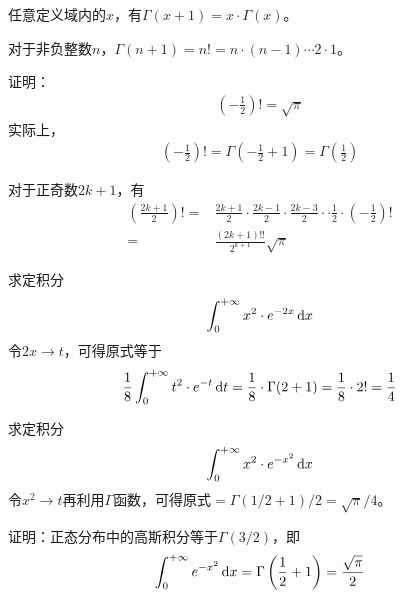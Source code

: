 \begin{question}
  任意定义域内的$x$，有$\Gamma(x + 1) = x\cdot \Gamma(x)$。
\end{question}

\begin{question}
  对于非负整数$n$，$\Gamma(n + 1) = n! = n\cdot (n-1) \cdots 2\cdot 1$。
\end{question}

\begin{question}
  证明：
  \begin{align}
    \left(-\frac12\right)! = \sqrt\pi
  \end{align}
  实际上，
  \begin{align*}
    \left(-\frac12\right)! = \Gamma\left(-\frac12 + 1\right) = \Gamma\left(\frac12\right)
  \end{align*}
\end{question}

\begin{example}
  对于正奇数$2k+1$，有
  \begin{align*}
    \left(\frac{2k+1}{2}\right)! =&
    \frac{2k+1}2 \cdot\frac{2k-1}2 \cdot\frac{2k-3}2 \cdot \cdot\frac{1}2 \cdot \left(-\frac12\right)!\\
    =&\frac{(2k+1)!!}{2^{k+1}} \sqrt\pi
  \end{align*}
\end{example}

\begin{example}
  求定积分
  \begin{align}
    \int_0^{+\infty} x^2\cdot e^{-2x} \,\mathrm{d}x
  \end{align}
  令$2x\to t$，可得原式等于
  \begin{align}
    \frac18 \int_0^{+\infty} t^2\cdot e^{-t} \,\mathrm{d}t = \frac18 \cdot \Gamma(2 + 1) = \frac18 \cdot 2! = \frac14
  \end{align}
\end{example}

\begin{example}
  求定积分
  \begin{align}
    \int_0^{+\infty} x^2\cdot e^{-x^2} \,\mathrm{d}x
  \end{align}
  令$x^2\to t$再利用$\Gamma$函数，可得原式$=\Gamma(1/2 + 1) / 2 = \sqrt\pi / 4$。
\end{example}

\begin{question}
  证明：正态分布中的高斯积分等于$\Gamma(3/2)$，即
  \begin{align}
    \int_0^{+\infty} e^{-x^2}\,\mathrm{d}x = \Gamma\left(\frac12+1\right) = \frac{\sqrt\pi}2
  \end{align}
\end{question}


